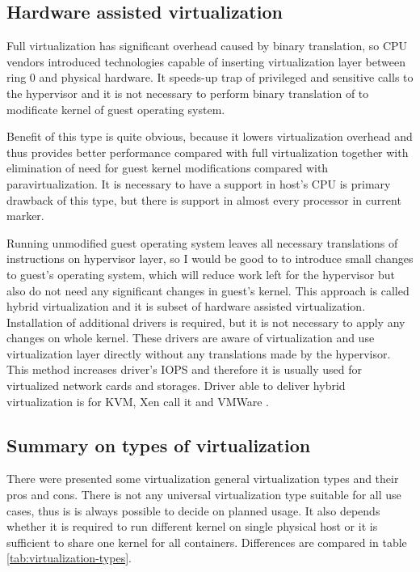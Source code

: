 \subsection{Hardware assisted virtualization}
Full virtualization has significant overhead caused by binary translation, so \Ac{CPU} vendors introduced technologies capable of inserting virtualization layer between ring 0 and physical hardware. It speeds-up trap of privileged and sensitive calls to the hypervisor and it is not necessary to perform binary translation of to modificate kernel of guest operating system. 

Benefit of this type is quite obvious, because it lowers virtualization overhead and thus provides better performance compared with full virtualization together with elimination of need for guest kernel modifications compared with paravirtualization. It is necessary to have a support in host's \Ac{CPU} is primary drawback of this type, but there is support in almost every processor in current marker.

Running unmodified guest operating system leaves all necessary translations of instructions on hypervisor layer, so I would be good to to introduce small changes to guest's operating system, which will reduce work left for the hypervisor but also do not need any significant changes in guest's kernel. This approach is called hybrid virtualization and it is subset of hardware assisted virtualization. Installation of additional drivers is required, but it is not necessary to apply any changes on whole kernel. These drivers are aware of virtualization and use virtualization layer directly without any translations made by the hypervisor. This method increases driver's \Ac{IOPS} and therefore it is usually used for virtualized network cards and storages. Driver able to deliver hybrid virtualization is  for \Ac{KVM}, Xen call it  and VMWare  .

\subsection{Summary on types of virtualization}
There were presented some virtualization general virtualization types and their pros and cons. There is not any universal virtualization type suitable for all use cases, thus is is always possible to decide on planned usage. It also depends whether it is required to run different kernel on single physical host or it is sufficient to share one kernel for all containers. Differences are compared in table \ref{tab:virtualization-types}.

